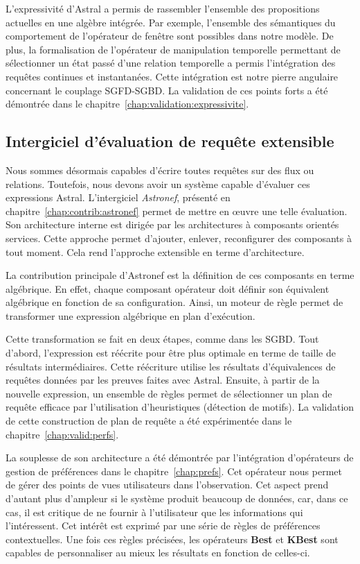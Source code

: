L'expressivité d'Astral a permis de rassembler l'ensemble des propositions actuelles en une algèbre intégrée. Par exemple, l'ensemble des sémantiques du comportement de l'opérateur de fenêtre sont possibles dans notre modèle. De plus, la formalisation de l'opérateur de manipulation temporelle permettant de sélectionner un état passé d'une relation temporelle a permis l'intégration des requêtes continues et instantanées. Cette intégration est notre pierre angulaire concernant le couplage SGFD-SGBD. La validation de ces points forts a été démontrée dans le chapitre~\ref{chap:validation:expressivite}.

\subsection{Intergiciel d'évaluation de requête extensible}
Nous sommes désormais capables d'écrire toutes requêtes sur des flux ou relations. Toutefois, nous devons avoir un système capable d'évaluer ces expressions Astral. L'intergiciel \textit{Astronef}, présenté en chapitre~\ref{chap:contrib:astronef} permet de mettre en œuvre une telle évaluation. Son architecture interne est dirigée par les architectures à composants orientés services. Cette approche permet d'ajouter, enlever, reconfigurer des composants à tout moment. Cela rend l'approche extensible en terme d'architecture.

La contribution principale d'Astronef est la définition de ces composants en terme algébrique. En effet, chaque composant opérateur doit définir son équivalent algébrique en fonction de sa configuration. Ainsi, un moteur de règle permet de transformer une expression algébrique en plan d'exécution.

Cette transformation se fait en deux étapes, comme dans les SGBD. Tout d'abord, l'expression est réécrite pour être plus optimale en terme de taille de résultats intermédiaires. Cette réécriture utilise les résultats d'équivalences de requêtes données par les preuves faites avec Astral. Ensuite, à partir de la nouvelle expression, un ensemble de règles permet de sélectionner un plan de requête efficace par l'utilisation d'heuristiques (détection de motifs). La validation de cette construction de plan de requête a été expérimentée dans le chapitre~\ref{chap:valid:perfs}. 

La souplesse de son architecture a été démontrée par l'intégration d'opérateurs de gestion de préférences dans le chapitre~\ref{chap:prefs}. Cet opérateur nous permet de gérer des points de vues utilisateurs dans l'observation. Cet aspect prend d'autant plus d'ampleur si le système produit beaucoup de données, car, dans ce cas, il est critique de ne fournir à l'utilisateur que les informations qui l'intéressent. Cet intérêt est exprimé par une série de règles de préférences contextuelles. Une fois ces règles précisées, les opérateurs \textbf{Best} et \textbf{KBest} sont capables de personnaliser au mieux les résultats en fonction de celles-ci.

